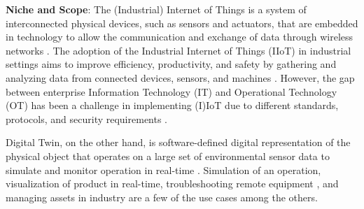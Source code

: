 
\textbf{Niche and Scope}:
% 
The (Industrial) Internet of Things is a system of interconnected physical devices, such as sensors and actuators, that are embedded in technology to allow the communication and exchange of data through wireless networks \cite{maillet-contozEndtoendSecurityValidation2020}. The adoption of the Industrial Internet of Things (IIoT) in industrial settings aims to improve efficiency, productivity, and safety by gathering and analyzing data from connected devices, sensors, and machines \cite{kumarBlockchainDeepLearning2022}. However, the gap between enterprise Information Technology (IT) and Operational Technology (OT) has been a challenge in implementing (I)IoT due to different standards, protocols, and security requirements \cite{adrienbacueDigitalTwinsEnhanced2022}.

Digital Twin, on the other hand, is software-defined digital representation of the physical object that operates on a large set of environmental sensor data to simulate and monitor operation in real-time \cite{williamdanilczykANGELIntelligentDigital2019, danilczykSmartGridAnomaly2021}. Simulation of an operation, visualization of product in real-time, troubleshooting remote equipment \cite{alcarazDigitalTwinComprehensive2022, veledarDigitalTwinsDependability2019, vargheseDigitalTwinbasedIntrusion2022}, and managing assets in industry are a few of the use cases among the others. 

